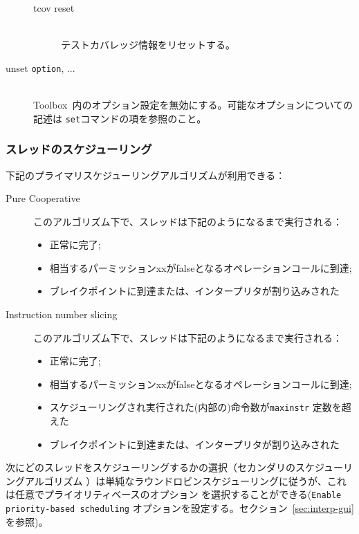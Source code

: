 \documentclass[\pformat,12pt]{jarticle}
\newcommand{\Toolbox}{Toolbox}
\begin{document}
\begin{description}
\begin{description}
  \item[tcov reset]\mbox{} \\
    テストカバレッジ情報をリセットする。
  \end{description}

\item[unset {\tt option}, ...]\mbox{}\\
  \Toolbox\ 内のオプション設定を無効にする。可能なオプションについての記述は
  {\tt set}コマンドの項を参照のこと。

\end{description}


\subsubsection{スレッドのスケジューリング}\label{subsec:scheduling}

下記のプライマリスケジューリングアルゴリズムが利用できる：

\begin{description}


\item[Pure Cooperative]
このアルゴリズム下で、スレッドは下記のようになるまで実行される：
\begin{itemize}
\item 正常に完了;
\item 相当するパーミッションxxがfalseとなるオペレーションコールに到達;
\item ブレイクポイントに到達または、インタープリタが割り込みされた
\end{itemize}
\item[Instruction number slicing]
このアルゴリズム下で、スレッドは下記のようになるまで実行される：
\begin{itemize}
\item 正常に完了;
\item 相当するパーミッションxxがfalseとなるオペレーションコールに到達;
\item スケジューリングされ実行された(内部の)命令数が\texttt{maxinstr} 定数を超えた
\item ブレイクポイントに到達または、インタープリタが割り込みされた
\end{itemize}



\end{description}



次にどのスレッドをスケジューリングするかの選択（セカンダリのスケジューリングアルゴリズム
）は単純なラウンドロビンスケジューリングに従うが、これは任意でプライオリティベースのオプション
を選択することができる(\texttt{Enable priority-based
  scheduling} オプションを設定する。セクション~\ref{sec:interp-gui}を参照)。
\end{document}
